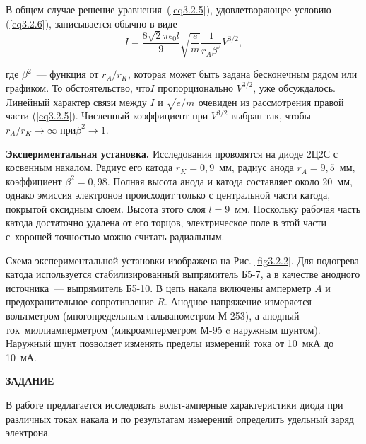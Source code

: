 В общем случае решение уравнения~(\ref{eq3.2.5}), удовлетворяющее условию (\ref{eq3.2.6}), записывается обычно в виде
\begin{equation}
I=\frac{8\sqrt{2}\pi\epsilon_0l}{9}\sqrt{\frac{e}{m}}\frac{1}{r_A\beta^2}V^{3/2},
\label{eq3.2.8}
\end{equation}

где $\beta^2$~--- функция от $r_A/r_K$, которая может быть задана бесконечным рядом или графиком. То обстоятельство, что$I$ пропорционально $V^{3/2}$, уже обсуждалось. Линейный характер связи между $I$ и $\sqrt{e/m}$ очевиден из
рассмотрения правой части (\ref{eq3.2.5}). Численный коэффициент при $V^{3/2}$ выбран так, чтобы $r_A/r_K\rightarrow\infty$ при$\beta^2\rightarrow 1$.

{\bf Экспериментальная установка.} Исследования проводятся на диоде {2Ц2С} с косвенным накалом. Радиус его катода $r_K=0,9$~мм, радиус анода
$r_A=9,5$~мм, коэффициент $\beta^2=0,98$. Полная высота анода и катода составляет около 20~мм, однако эмиссия электронов происходит только с центральной части катода, покрытой оксидным слоем. Высота этого слоя $l=9$~мм. Поскольку рабочая часть катода достаточно удалена от его торцов, электрическое поле в этой части с~хорошей точностью можно считать радиальным.

Схема экспериментальной установки изображена на Рис. \ref{fig3.2.2}. Для подогрева катода используется стабилизированный выпрямитель {Б5-7}, а в качестве анодного источника~--- выпрямитель Б5-10. В цепь накала включены амперметр $A$ и предохранительное сопротивление $R$. Анодное напряжение измеряется вольтметром (многопредельным гальванометром М-253), а анодный ток~миллиамперметром (микроамперметром М-95 c наружным шунтом). Наружный шунт позволяет изменять пределы измерений тока от 10~мкА до 10~мА.

{\Large \bf ЗАДАНИЕ}

В работе предлагается исследовать вольт-амперные характеристики диода при различных токах накала и по результатам
измерений определить удельный заряд электрона.

